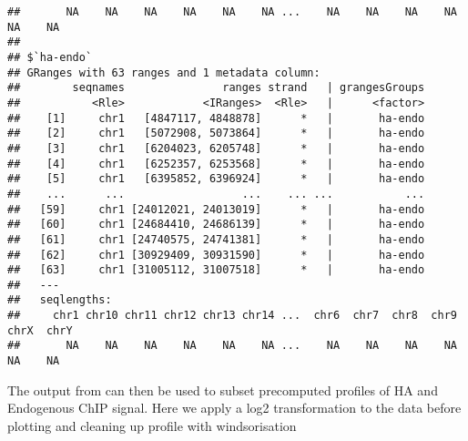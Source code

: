 \documentclass[12pt]{article}\usepackage[]{graphicx}\usepackage[usenames,dvipsnames]{color}
\makeatletter
\newenvironment{kframe}{%
 \def\at@end@of@kframe{}%
 \ifinner\ifhmode%
  \def\at@end@of@kframe{\end{minipage}}%
  \begin{minipage}{\columnwidth}%
 \fi\fi%
 \def\FrameCommand##1{\hskip\@totalleftmargin \hskip-\fboxsep
 \colorbox{shadecolor}{##1}\hskip-\fboxsep
     \hskip-\linewidth \hskip-\@totalleftmargin \hskip\columnwidth}%
 \MakeFramed {\advance\hsize-\width
   \@totalleftmargin\z@ \linewidth\hsize
   \@setminipage}}%
 {\par\unskip\endMakeFramed%
 \at@end@of@kframe}
\newenvironment{knitrout}{}{} %
\makeatother
\begin{document}
\begin{knitrout}
\begin{kframe}
\begin{verbatim}
##       NA    NA    NA    NA    NA    NA ...    NA    NA    NA    NA    NA    NA
## 
## $`ha-endo`
## GRanges with 63 ranges and 1 metadata column:
##        seqnames               ranges strand   | grangesGroups
##           <Rle>            <IRanges>  <Rle>   |      <factor>
##    [1]     chr1   [4847117, 4848878]      *   |       ha-endo
##    [2]     chr1   [5072908, 5073864]      *   |       ha-endo
##    [3]     chr1   [6204023, 6205748]      *   |       ha-endo
##    [4]     chr1   [6252357, 6253568]      *   |       ha-endo
##    [5]     chr1   [6395852, 6396924]      *   |       ha-endo
##    ...      ...                  ...    ... ...           ...
##   [59]     chr1 [24012021, 24013019]      *   |       ha-endo
##   [60]     chr1 [24684410, 24686139]      *   |       ha-endo
##   [61]     chr1 [24740575, 24741381]      *   |       ha-endo
##   [62]     chr1 [30929409, 30931590]      *   |       ha-endo
##   [63]     chr1 [31005112, 31007518]      *   |       ha-endo
##   ---
##   seqlengths:
##     chr1 chr10 chr11 chr12 chr13 chr14 ...  chr6  chr7  chr8  chr9  chrX  chrY
##       NA    NA    NA    NA    NA    NA ...    NA    NA    NA    NA    NA    NA
\end{verbatim}
\end{kframe}
\end{knitrout}


The output from  can then be used to subset precomputed profiles of HA and Endogenous ChIP signal. Here we apply a log2 transformation to the data before plotting and cleaning up profile with windsorisation
\end{document}
